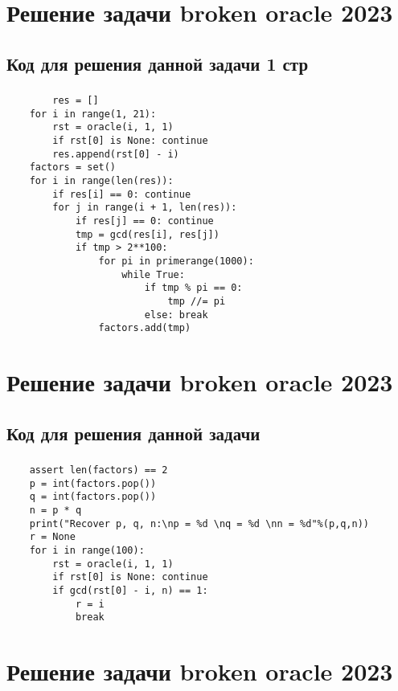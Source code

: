 \documentclass[t]{beamer}
\begin{document}
\section{Решение задачи broken oracle 2023}
\subsection{Код для решения данной задачи 1 стр}
\begin{frame}[fragile]
\frametitle{\insertsection} 
\framesubtitle{\insertsubsection}
\footnotesize
\smaller
\begin{lstlisting}
        res = []                               
    for i in range(1, 21):
        rst = oracle(i, 1, 1)
        if rst[0] is None: continue
        res.append(rst[0] - i)
    factors = set()
    for i in range(len(res)):                
        if res[i] == 0: continue
        for j in range(i + 1, len(res)):
            if res[j] == 0: continue
            tmp = gcd(res[i], res[j])
            if tmp > 2**100:
                for pi in primerange(1000):
                    while True:
                        if tmp % pi == 0:
                            tmp //= pi
                        else: break
                factors.add(tmp)
\end{lstlisting}	
\end{frame}

\section{Решение задачи broken oracle 2023}
\subsection{Код для решения данной задачи}
\begin{frame}[fragile]
\frametitle{\insertsection} 
\framesubtitle{\insertsubsection}
\footnotesize
\smaller
\begin{lstlisting}
    assert len(factors) == 2
    p = int(factors.pop())
    q = int(factors.pop())
    n = p * q
    print("Recover p, q, n:\np = %d \nq = %d \nn = %d"%(p,q,n))
    r = None
    for i in range(100):
        rst = oracle(i, 1, 1)
        if rst[0] is None: continue
        if gcd(rst[0] - i, n) == 1:
            r = i
            break 
\end{lstlisting}	
\end{frame}

\section{Решение задачи broken oracle 2023}
\end{document}
